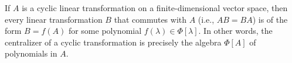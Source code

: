 If $A$ is a cyclic linear transformation on a finite-dimensional vector space, then every linear transformation $B$ that commutes with $A$ (i.e., $AB = BA$) is of the form $B = f(A)$ for some polynomial $f(\lambda) \in \Phi[\lambda]$. In other words, the centralizer of a cyclic transformation is precisely the algebra $\Phi[A]$ of polynomials in $A$.

